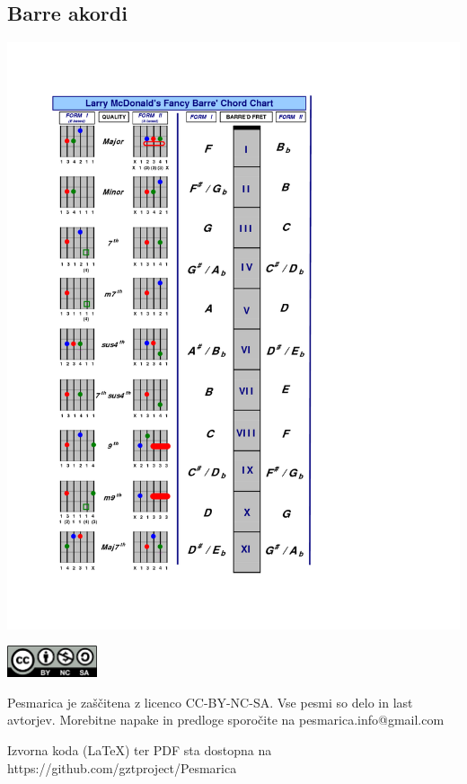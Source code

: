 \documentclass[a4paper,12pt]{article}
\begin{document}
\begin{multicols}{2}
\subsection*{Barre akordi}
\includegraphics[width=140mm]{img/barre.png}
\clearpage
\end{multicols}
\clearpage
\clearpage
\null
\vfill
\center
\includegraphics[width=100px]{img/licence.png}

Pesmarica je zaščitena z licenco CC-BY-NC-SA. Vse pesmi so delo in last avtorjev. Morebitne napake in predloge sporočite na pesmarica.info@gmail.com 

Izvorna koda (LaTeX) ter PDF sta dostopna na https://github.com/gztproject/Pesmarica
\end{document}
